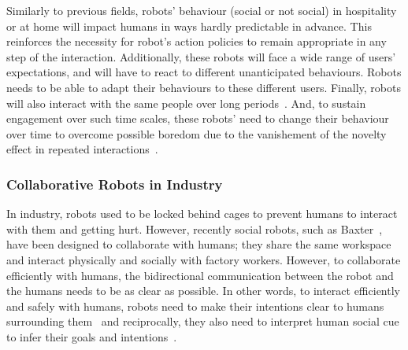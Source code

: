     Similarly to previous fields, robots' behaviour (social or not social) in hospitality or at home will impact humans in ways hardly predictable in advance. This reinforces the necessity for robot's action policies to remain appropriate in any step of the interaction. Additionally, these robots will face a wide range of users' expectations, and will have to react to different unanticipated behaviours. Robots needs to be able to adapt their behaviours to these different users. Finally, robots will also interact with the same people over long periods~\citep{leite2013social}. And, to sustain engagement over such time scales, these robots' need to change their behaviour over time to overcome possible boredom due to the vanishement of the novelty effect in repeated interactions~\citep{salter2004robots}.%

\subsubsection{Collaborative Robots in Industry}
	In industry, robots used to be locked behind cages to prevent humans to interact with them and getting hurt. However, recently social robots, such as Baxter~\citep{guizzo2012rethink}, have been designed to collaborate with humans; they share the same workspace and interact physically and socially with factory workers. 
	However, to collaborate efficiently with humans, the bidirectional communication between the robot and the humans needs to be as clear as possible. In other words, to interact efficiently and safely with humans, robots need to make their intentions clear to humans surrounding them~\citep{dragan2013legibility} and reciprocally, they also need to interpret human social cue to infer their goals and intentions~\citep{scheutz2007first}.
	
